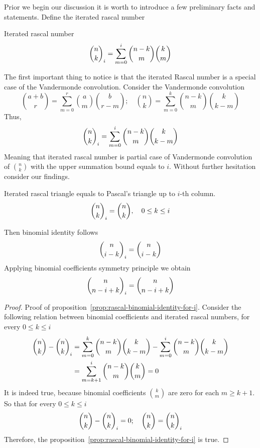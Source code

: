 ﻿Prior we begin our discussion it is worth to introduce a few preliminary facts and statements.
Define the iterated rascal number
\begin{definition}
    Iterated rascal number
    \begin{align}
        \binom{n}{k}_{i} = \sum_{m=0}^{i} \binom{n-k}{m} \binom{k}{m}
    \end{align}
\end{definition}
The first important thing to notice is that the iterated Rascal number is a special case of the Vandermonde convolution.
Consider the Vandermonde convolution~\cite{andrews1999special}
\begin{equation*}
    \binom{a+b}{r} = \sum_{m=0}^{r} \binom{a}{m} \binom{b}{r-m}; \quad \binom{n}{k} = \sum_{m=0}^{k} \binom{n-k}{m} \binom{k}{k-m}
\end{equation*}
Thus,
\begin{equation}
    \binom{n}{k}_{i} = \sum_{m=0}^{i} \binom{n-k}{m} \binom{k}{k-m}
    \label{eq:rascal-vandermonde-convolution}
\end{equation}
Meaning that iterated rascal number is partial case of Vandermonde convolution of $\binom{n}{k}$
with the upper summation bound equals to $i$.
Without further hesitation consider our findings.
\begin{proposition}
    \label{prop:rascal-binomial-identity-for-i}
    Iterated rascal triangle equals to Pascal's triangle up to $i$-th column.
    \begin{equation}
        \binom{n}{k}_{i} = \binom{n}{k}, \quad 0 \leq k \leq i
        \label{eq:rascal-column-identity}
    \end{equation}
\end{proposition}
Then binomial identity follows
\begin{align*}
    \binom{n}{i-k}_{i} = \binom{n}{i-k}
\end{align*}
Applying binomial coefficients symmetry principle we obtain
\begin{align*}
    \binom{n}{n-i+k}_{i} = \binom{n}{n-i+k}
\end{align*}
\begin{proof}
    Proof of proposition~\eqref{prop:rascal-binomial-identity-for-i}.
    Consider the following relation between binomial coefficients and iterated rascal numbers,
    for every $0 \leq k \leq i$
    \begin{align*}
        \binom{n}{k} - \binom{n}{k}_{i} &= \sum_{m=0}^{k} \binom{n-k}{m} \binom{k}{k-m} - \sum_{m=0}^{i} \binom{n-k}{m} \binom{k}{k-m} \\
        &=  \sum_{m=k+1}^{i} \binom{n-k}{m} \binom{k}{m} = 0
    \end{align*}
    It is indeed true, because binomial coefficients $\binom{k}{m}$ are zero for each $m \geq k+1$.
    So that for every $0 \leq k \leq i$
    \begin{align*}
        \binom{n}{k} - \binom{n}{k}_{i} = 0; \quad \binom{n}{k} = \binom{n}{k}_{i}
    \end{align*}
    Therefore, the proposition~\eqref{prop:rascal-binomial-identity-for-i} is true.
\end{proof}
